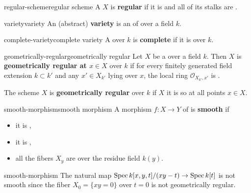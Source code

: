\begin{topic}{regular-scheme}{regular scheme}
    A  $X$ is \textbf{regular} if it is  and all of its stalks are .
\end{topic}

\begin{topic}{variety}{variety}
    An (abstract) \textbf{variety} is an    of  over a field $k$.
\end{topic}

\begin{topic}{complete-variety}{complete variety}
    A  over $k$ is \textbf{complete} if it is  over $k$.
\end{topic}

\begin{topic}{geometrically-regular}{geometrically regular}
    Let $X$ be a   over a field $k$. Then $X$ is \textbf{geometrically regular at $x \in X$} over $k$ if for every finitely generated field extension $k \subset k'$ and any $x' \in X_{k'}$ lying over $x$, the local ring $\mathcal{O}_{X_{k'}, x'}$ is .
    
    The scheme $X$ is \textbf{geometrically regular} over $k$ if $X$ it is so at all points $x \in X$.
\end{topic}

\begin{topic}{smooth-morphism}{smooth morphism}
    A morphism $f : X \to Y$ of  is \textbf{smooth} if
    \begin{itemize}
        \item it is ,
        \item it is ,
        \item all the fibers $X_y$ are  over the residue field $k(y)$.
    \end{itemize}
\end{topic}

\begin{example}{smooth-morphism}
    The natural map $\operatorname{Spec} k[x, y, t] / (xy - t) \to \operatorname{Spec} k[t]$ is not smooth since the fiber $X_0 = \{ xy = 0 \}$ over $t = 0$ is not geometrically regular.
\end{example}

